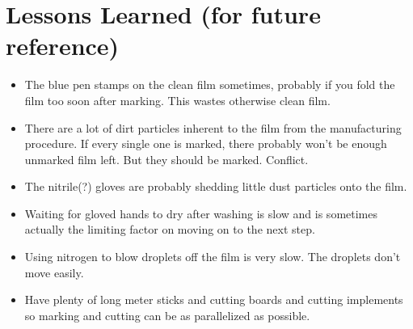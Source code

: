 \documentclass{article}
\begin{document}
\section{Lessons Learned (for future reference)}
\begin{itemize}
\item The blue pen stamps on the clean film sometimes, probably if you fold the film too soon after marking. This wastes otherwise clean film.
\item There are a lot of dirt particles inherent to the film from the manufacturing procedure. If every single one is marked, there probably won't be enough unmarked film left. But they should be marked. Conflict. 
\item The nitrile(?) gloves are probably shedding little dust particles onto the film. 
\item Waiting for gloved hands to dry after washing is slow and is sometimes actually the limiting factor on moving on to the next step. 
\item Using nitrogen to blow droplets off the film is very slow. The droplets don't move easily.
\item Have plenty of long meter sticks and cutting boards and cutting implements so marking and cutting can be as parallelized as possible. 
\end{itemize}
\end{document}
